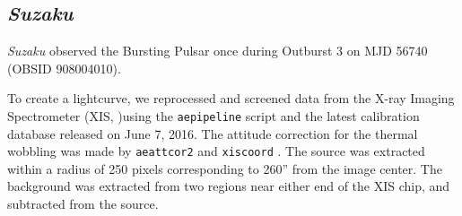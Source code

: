 \subsection{\textit{Suzaku}}
\par \textit{Suzaku} \citep{Mitsuda_Suzaku} observed the Bursting Pulsar once during Outburst 3 on MJD 56740 (OBSID 908004010).
\par To create a lightcurve, we reprocessed and screened data from the X-ray Imaging Spectrometer (XIS, \citealp{Koyama_XIS})using the \texttt{aepipeline} script and the latest calibration database released on June 7, 2016.  The attitude correction for the thermal wobbling was made by \texttt{aeattcor2} and \texttt{xiscoord} \citep{Uchiyama_SuzPSF}. The source was extracted within a radius of 250 pixels corresponding to 260'' from the image center.  The background was extracted from two regions near either end of the XIS chip, and subtracted from the source.

